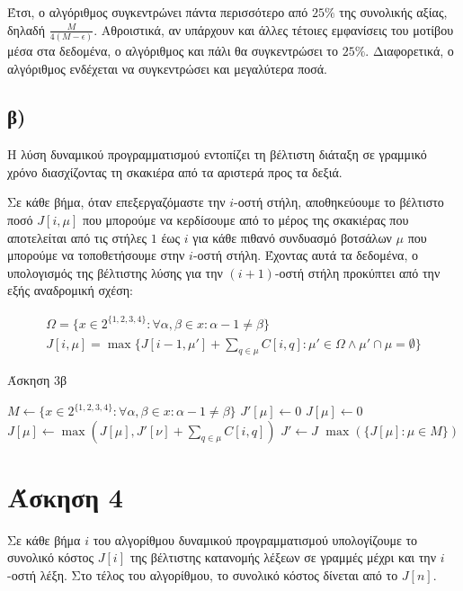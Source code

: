 \documentclass[11pt,a4paper]{book}
\begin{document}
Έτσι, ο αλγόριθμος συγκεντρώνει πάντα περισσότερο από $25\%$ της συνολικής αξίας, δηλαδή $\frac{M}{4(M - \epsilon)}$. Αθροιστικά, αν υπάρχουν και άλλες τέτοιες εμφανίσεις του μοτίβου μέσα στα δεδομένα, ο αλγόριθμος και πάλι θα συγκεντρώσει το $25\%$. Διαφορετικά, ο αλγόριθμος ενδέχεται να συγκεντρώσει και μεγαλύτερα ποσά.

\subsection*{β)}
Η λύση δυναμικού προγραμματισμού εντοπίζει τη βέλτιστη διάταξη σε γραμμικό χρόνο διασχίζοντας τη σκακιέρα από τα αριστερά προς τα δεξιά.

Σε κάθε βήμα, όταν επεξεργαζόμαστε την $i$-οστή στήλη, αποθηκεύουμε το βέλτιστο ποσό $J[ i, \mu ]$ που μπορούμε να κερδίσουμε από το μέρος της σκακιέρας που αποτελείται από τις στήλες $1$ έως $i$ για κάθε πιθανό συνδυασμό βοτσάλων $\mu$ που μπορούμε να τοποθετήσουμε στην $i$-οστή στήλη. Έχοντας αυτά τα δεδομένα, ο υπολογισμός της βέλτιστης λύσης για την $(i + 1)$-οστή στήλη προκύπτει από την εξής αναδρομική σχέση:

\begin{align*}
	\Omega = \{ x \in 2^{\{1, 2, 3, 4\}}: \forall \alpha, \beta \in x: \alpha - 1 \neq \beta \}\\
	J[ i, \mu ] = \max\{J[ i - 1, \mu' ] + \sum_{q \in \mu}{C[ i, q ]}: \mu' \in \Omega \land \mu' \cap \mu = \emptyset\}
\end{align*}



\begin{algorithm}[H]
\caption{\textgreek{Άσκηση 3β}}
\begin{algorithmic}[1]
	\State $M \gets \{ x \in 2^{\{1, 2, 3, 4\}}: \forall \alpha, \beta \in x: \alpha - 1 \neq \beta \}$
		\State $J'[ \mu ] \gets 0$
	\EndFor
			\State $J[ \mu ] \gets 0$
				\If {$\nu \cap \mu = \emptyset$}
					\State $J[ \mu ] \gets \max( J[ \mu ], J'[ \nu ] + \sum_{q \in \mu}{C[ i, q ]} )$
				\EndIf
			\EndFor
		\EndFor
		\State $J' \gets J$
	\EndFor
	\State \Return $\max( \{ J[ \mu ]: \mu \in M \} )$
\EndProcedure
\end{algorithmic}
\end{algorithm}

\section*{Άσκηση 4}
Σε κάθε βήμα $i$ του αλγορίθμου δυναμικού προγραμματισμού υπολογίζουμε το συνολικό κόστος $J[ i ]$ της βέλτιστης κατανομής λέξεων σε γραμμές μέχρι και την $i$-οστή λέξη. Στο τέλος του αλγορίθμου, το συνολικό κόστος δίνεται από το $J[ n ]$.
\end{document}
